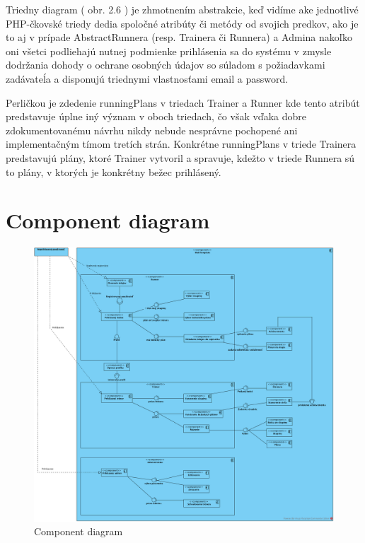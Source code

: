 \documentclass[12pt,a4paper]{report}
\theoremstyle{definition}
\theoremstyle{remark}
\begin{document}
Triedny diagram ( obr. 2.6 ) je zhmotnením abstrakcie, keď vidíme ake jednotlivé PHP-čkovské triedy dedia spoločné atribúty či metódy od svojich predkov, ako je to aj v prípade AbstractRunnera (resp. Trainera či Runnera) a Admina nakoľko oni všetci podliehajú nutnej podmienke prihlásenia sa do systému v zmysle dodržania dohody o ochrane osobných údajov so súladom s požiadavkami zadávateĺa a disponujú triednymi vlastnosťami email a password.

Perličkou je zdedenie runningPlans v triedach Trainer a Runner kde tento atribút predstavuje úplne iný význam v oboch triedach, čo však vďaka dobre zdokumentovanému návrhu nikdy nebude nesprávne pochopené ani implementačným tímom tretích strán. Konkrétne runningPlans v triede Trainera predstavujú plány, ktoré Trainer vytvoril a spravuje, kdežto v triede Runnera sú to plány, v ktorých je konkrétny bežec prihlásený.

\newpage
\section{Component diagram}
\begin{figure}[H]
\centering
\includegraphics[width=\textwidth]{ComponentDiagram.png}
\caption{Component diagram}
\end{figure}
\end{document}
